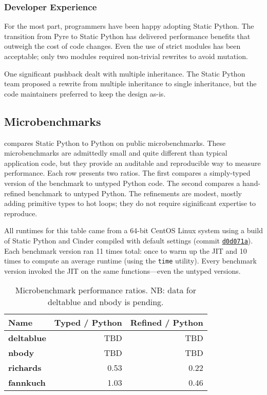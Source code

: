 \documentclass[english,cleveref,submission]{programming}
\newcommand{\SP}{Static Python}
\newcommand{\code}[1]{\texttt{#1}}
\newcommand{\bmname}[1]{\textbf{#1}}
\begin{document}
\subsubsection{Developer Experience}

For the most part, programmers have been happy adopting \SP{}.
The transition from Pyre to \SP{} has delivered performance benefits
that outweigh the cost of code changes.
Even the use of strict modules has been acceptable; only two modules
required non-trivial rewrites to avoid mutation.

One significant pushback dealt with multiple inheritance.
The \SP{} team proposed a rewrite from multiple inheritance to single inheritance,
but the code maintainers preferred to keep the design as-is.


\subsection{Microbenchmarks}

 compares \SP{} to Python on public microbenchmarks.
These microbenchmarks are admittedly small and quite different than typical application code,
but they provide an auditable and reproducible way to measure performance.
Each row presents two ratios.
The first compares a simply-typed version of the benchmark to untyped Python code.
The second compares a hand-refined benchmark to untyped Python.
The refinements are modest, mostly adding primitive types to hot loops;
they do not require siginificant expertise to reproduce.

All runtimes for this table came from a 64-bit CentOS Linux system using a build
of \SP{} and Cinder compiled with default settings
(commit \href{https://github.com/facebookincubator/cinder/commit/d0d071a9acf3e65700e7c6f8982c5087c700d116}{\code{d0d071a}}).
Each benchmark version ran 11 times total: once to warm up the JIT and 10 times to
compute an average runtime (using the \code{time} utility).
Every benchmark version invoked the JIT on the same functions---even the untyped versions.

\begin{table}[t]
  \caption{Microbenchmark performance ratios. NB: data for deltablue and nbody is pending.}
  \label{t:microbenchmark}
  \begin{tabular}{lrr}
    Name               & Typed / Python & Refined / Python \\\midrule
    \bmname{deltablue} &          TBD &            TBD \\
    \bmname{nbody}     &          TBD &            TBD \\
    \bmname{richards}  &         0.53 &           0.22 \\
    \bmname{fannkuch}  &         1.03 &           0.46
  \end{tabular}
\end{table}
\end{document}
